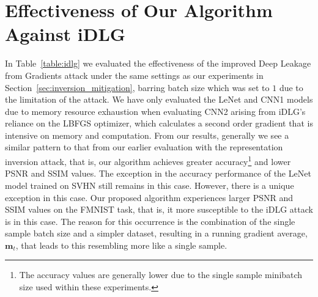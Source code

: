 \documentclass[conference,compsoc]{IEEEtran}
\begin{document}
\section{Effectiveness of Our Algorithm Against iDLG}

In Table~\ref{table:idlg} we evaluated the effectiveness of the improved Deep Leakage from Gradients attack \cite{zhao2020idlg} under the same settings as our experiments in Section~\ref{sec:inversion_mitigation}, barring batch size which was set to $1$ due to the limitation of the attack. We have only evaluated the LeNet and CNN1 models due to memory resource exhaustion when evaluating CNN2 arising from iDLG's reliance on the LBFGS optimizer, which calculates a second order gradient that is intensive on memory and computation. From our results, generally we see a similar pattern to that from our earlier evaluation with the representation inversion attack, that is, our algorithm achieves greater accuracy\footnote{The accuracy values are generally lower due to the single sample minibatch size used within these experiments.} and lower PSNR and SSIM values. The exception in the accuracy performance of the LeNet model trained on SVHN still remains in this case. However, there is a unique exception in this case. Our proposed algorithm experiences larger PSNR and SSIM values on the FMNIST task, that is, it more susceptible to the iDLG attack is in this case. The reason for this occurrence is the combination of the single sample batch size and a simpler dataset, resulting in a running gradient average, $\bm{m}_t$, that leads to this resembling more like a single sample.
\end{document}
